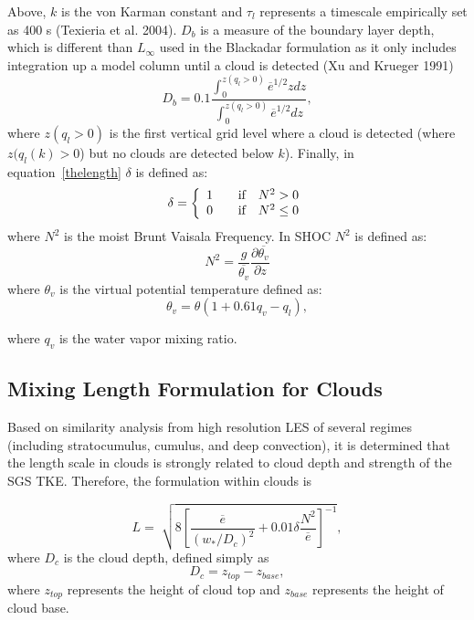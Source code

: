 \documentclass[12pt,titlepage]{article}
\numberwithin{equation}{section}
\begin{document}
Above, $k$ is the von Karman constant and $\tau_{l}$ represents a timescale empirically set as 400 s (Texieria et al. 2004).  $D_{b}$ is a measure of the boundary layer depth, which is different than $L_{\infty}$ used in the Blackadar formulation as it only includes integration up a model column until a cloud is detected (Xu and Krueger 1991)
%
 \begin{equation}
  D_{b}=0.1\frac{\int_{0}^{z(q_{l} > 0)}\overline{e}^{1/2}z dz}{\int_{0}^{z(q_{l} > 0)} \overline{e}^{1/2} dz}, 
  \end{equation}
 where $z(q_{l} > 0)$ is the first vertical grid level where a cloud is detected (where $z(q_{l}(k) > 0$) but no clouds are detected below $k$).  Finally, in equation~\ref{thelength} $\delta$ is defined as:
\[
\delta = \left\{ 
\begin{array}{l l}
  1 & \quad \text{if} \quad N^{2} > 0 \\
  0 & \quad \text{if} \quad N^{2} \le 0 \\
\end{array} \right.
\]     
%
where $N^{2}$ is the moist Brunt Vaisala Frequency.  In SHOC $N^{2}$ is defined as:
%
\begin{equation}
  N^{2} = \frac{g}{\overline{\theta_{v}}}\frac{\partial{\overline{\theta_{v}}}}{\partial{z}}
  \label{brunt}
\end{equation}
%
where $\theta_{v}$ is the virtual potential temperature defined as:
%
\begin{equation}
  \theta_{v}=\theta(1 + 0.61q_{v} - q_{l}) , 
  \label{thetav}
\end{equation}

where $q_{v}$ is the water vapor mixing ratio.  

\subsection{Mixing Length Formulation for Clouds}
\label{length_newformc}

Based on similarity analysis from high resolution LES of several regimes (including stratocumulus, cumulus, and deep convection), it is determined that the length scale in clouds is strongly related to cloud depth and strength of the SGS TKE.  Therefore, the formulation within clouds is

\begin{equation}
  L=\sqrt[]{8\left[ \frac{\overline{e}}{(w_{*}/D_{c})^2}+0.01\delta\frac{N^2}{\overline{e}}\right]^{-1}} , 
  \label{incloud}
\end{equation}
%
where $D_{c}$ is the cloud depth, defined simply as
%
\begin{equation}
  D_{c}=z_{top}-z_{base},
  \label{cloud_length}
\end{equation}
%
where $z_{top}$ represents the height of cloud top and $z_{base}$ represents the height of cloud base.  
\end{document}
